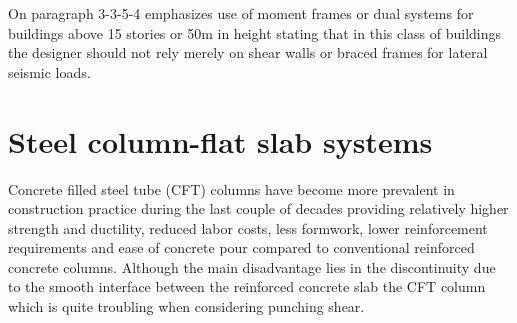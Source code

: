 \documentclass[twocolumn]{article} %
\begin{document}
 On paragraph 3-3-5-4 \citep{28002014} %
 emphasizes use of moment frames or dual systems for buildings above 15 stories or 50m in height stating that in this class of buildings the designer should not rely merely on shear walls or braced frames for lateral seismic loads.

\section{Steel column-flat slab systems}\label{cft}
Concrete filled steel tube (CFT) columns have become more prevalent in construction practice during the last couple of decades providing relatively higher strength and ductility\citep{MORINO1998336}, reduced labor costs, less formwork, lower reinforcement requirements and ease of concrete pour compared to conventional reinforced concrete columns. Although the main disadvantage lies in the discontinuity due to the smooth interface between the reinforced concrete slab the CFT column which is quite troubling when considering punching shear\citep{yu2018}. 
\end{document}
